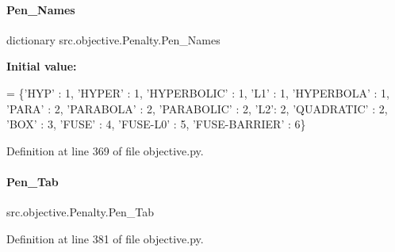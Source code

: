 \mbox{\label{classsrc_1_1objective_1_1Penalty_aa4376227d51b15dd02140dc80117eacc}} 
\paragraph{\texorpdfstring{Pen\+\_\+\+Names}{Pen\_Names}}
{\footnotesize\ttfamily dictionary src.\+objective.\+Penalty.\+Pen\+\_\+\+Names\hspace{0.3cm}{\ttfamily [static]}}

{\bfseries Initial value\+:}
\begin{DoxyCode}
=  \{\textcolor{stringliteral}{'HYP'} : 1, \textcolor{stringliteral}{'HYPER'} : 1, \textcolor{stringliteral}{'HYPERBOLIC'} : 1, \textcolor{stringliteral}{'L1'} : 1, \textcolor{stringliteral}{'HYPERBOLA'} : 1,
                 \textcolor{stringliteral}{'PARA'} : 2, \textcolor{stringliteral}{'PARABOLA'} : 2, \textcolor{stringliteral}{'PARABOLIC'} : 2, \textcolor{stringliteral}{'L2'}: 2, \textcolor{stringliteral}{'QUADRATIC'} : 2,
                 \textcolor{stringliteral}{'BOX'} : 3, \textcolor{stringliteral}{'FUSE'} : 4, \textcolor{stringliteral}{'FUSE-L0'} : 5, \textcolor{stringliteral}{'FUSE-BARRIER'} : 6\}
\end{DoxyCode}


Definition at line 369 of file objective.\+py.

\mbox{\label{classsrc_1_1objective_1_1Penalty_ae0d1f6e2d30d3452a47825d332f41cc3}} 
\paragraph{\texorpdfstring{Pen\+\_\+\+Tab}{Pen\_Tab}}
{\footnotesize\ttfamily src.\+objective.\+Penalty.\+Pen\+\_\+\+Tab}



Definition at line 381 of file objective.\+py.

\mbox{\label{classsrc_1_1objective_1_1Penalty_acc858beb8126e12b33df0b58ba51b74d}} 

